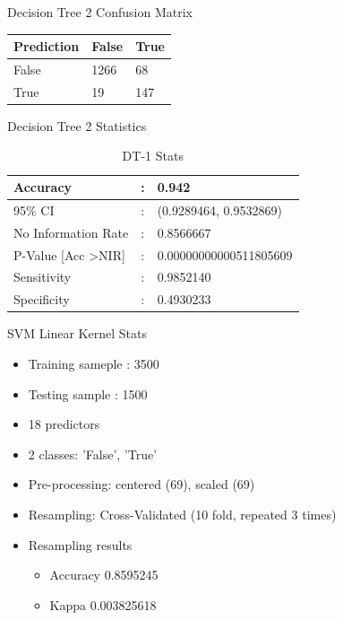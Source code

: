 \documentclass{beamer}
\begin{document}
\begin{frame}{Decision Tree 2 Confusion Matrix}
	\begin{table}
		\begin{tabular}{lll}
			\hline
			Prediction & False & True \\
			\hline
			False & 1266 & 68 \\
			\hline
			True & 19 & 147 \\
			\hline
		\end{tabular}
	\end{table}
\end{frame}

\begin{frame}{Decision Tree 2 Statistics}
	\begin{table}[]
		\centering
		\caption{DT-1 Stats}
		\label{dt-1-stats}
		\begin{tabular}{p{5cm}p{1cm}p{5cm}}
			Accuracy  & : & 0.942 \\
			\hline
			95\% CI   & : & (0.9289464, 0.9532869) \\ \hline
			No Information Rate  & : & 0.8566667 \\ \hline
			P-Value {[}Acc \textgreater NIR{]}  & : & 0.00000000000511805609 \\ \hline
			Sensitivity  & : & 0.9852140 \\ \hline
			Specificity  & : & 0.4930233 \\ \hline
			
		\end{tabular}
	\end{table}
\end{frame}

\begin{frame}{SVM Linear Kernel Stats}
	\begin{itemize}
		\item Training sameple : 	3500
		\item Testing sample : 1500
		\item 18 predictors
		\item 2 classes: 'False', 'True' 
		\item Pre-processing: centered (69), scaled (69) 
		\item Resampling: Cross-Validated (10 fold, repeated 3 times) 
		\item Resampling results
		\begin{itemize}
			\item Accuracy  0.8595245
			\item Kappa      0.003825618 
		\end{itemize}
	\end{itemize}
\end{frame}
\end{document}
